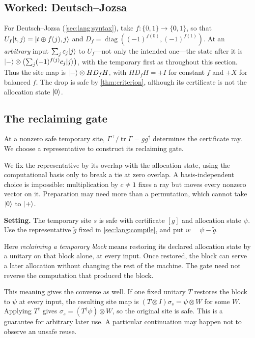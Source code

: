 \documentclass[acmsmall,screen,review,anonymous,nonacm]{acmart}
\begin{document}
\subsection{Worked: Deutsch--Jozsa}\label{sec:dj}

For Deutsch--Jozsa (\cref{sec:lang:syntax}), take $f : \{0,1\} \to \{0,1\}$, so that $U_f\lvert t,j \rangle = \lvert t \oplus
f(j),j \rangle$ and $D_f = \operatorname{diag}((-1)^{f(0)}, (-1)^{f(1)})$. At an \emph{arbitrary} input
$\sum_j c_j\lvert j \rangle$ to $U_f$---not only the intended one---the state after
it is $\lvert - \rangle\otimes\bigl(\sum_j (-1)^{f(j)} c_j \lvert j \rangle\bigr)$,
with the temporary first as throughout this section.
Thus the site map is $\lvert - \rangle\otimes HD_fH$, with $HD_fH=\pm I$ for
constant $f$ and $\pm X$ for balanced $f$. The drop is safe by
\cref{thm:criterion}, although its certificate is not the allocation
state $\lvert 0 \rangle$.

\subsection{The reclaiming gate}\label{sec:pool}

At a nonzero safe temporary site,
$\Gamma^{\top}/\operatorname{tr}\Gamma=gg^{\dagger}$ determines the
certificate ray. We choose a representative to construct its reclaiming gate.

We fix the representative by its overlap with the allocation state,
using the computational basis only to break a tie at zero overlap.
A basis-independent choice is impossible: multiplication by $c\ne1$
fixes a ray but moves every nonzero vector on it. Preparation may need
more than a permutation, which cannot take $\lvert 0 \rangle$ to $\lvert + \rangle$.

\textbf{Setting.} The temporary site $s$ is safe with certificate $[g]$
and allocation state $\psi$. Use the representative $\tilde g$ fixed in
\cref{sec:lang:compile}, and put $w=\psi-\tilde g$.

\stmtReuse

Here \emph{reclaiming a temporary block} means restoring its declared
allocation state by a unitary on that block alone, at every input. Once
restored, the block can serve a later allocation without changing the
rest of the machine. The gate need not reverse the computation that
produced the block.

This meaning gives the converse as well. If one fixed unitary $T$
restores the block to $\psi$ at every input, the resulting site map is
$(T\otimes I)\sigma_s=\psi\otimes W$ for some $W$. Applying $T^{\dagger}$
gives $\sigma_s=(T^{\dagger}\psi)\otimes W$, so the original site is safe.
This is a guarantee for arbitrary later use. A particular continuation
may happen not to observe an unsafe reuse.
\end{document}
